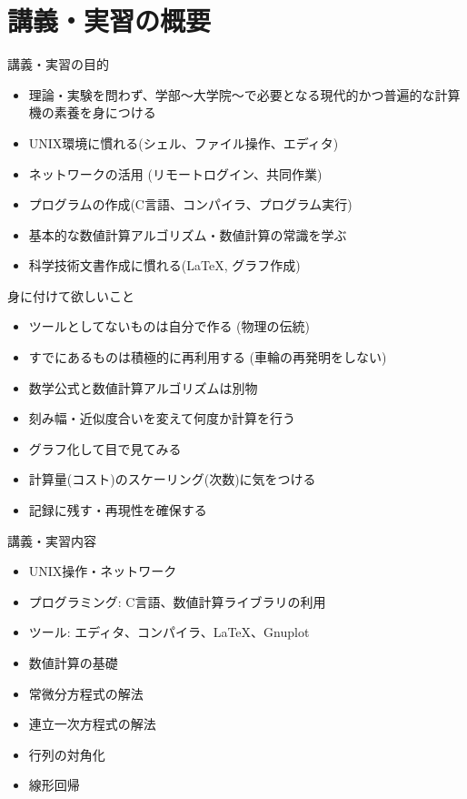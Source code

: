 \section{講義・実習の概要}

\begin{frame}[t]{講義・実習の目的}
  \begin{itemize}
  \item 理論・実験を問わず、学部〜大学院〜で必要となる現代的かつ普遍的な計算機の素養を身につける
  \item UNIX環境に慣れる(シェル、ファイル操作、エディタ)
  \item ネットワークの活用 (リモートログイン、共同作業)
  \item プログラムの作成(C言語、コンパイラ、プログラム実行)
  \item 基本的な数値計算アルゴリズム・数値計算の常識を学ぶ
  \item 科学技術文書作成に慣れる(\LaTeX, グラフ作成)
  \end{itemize}
\end{frame}

\begin{frame}[t]{身に付けて欲しいこと}
  \begin{itemize}
  \item ツールとしてないものは自分で作る (物理の伝統)
  \item すでにあるものは積極的に再利用する (車輪の再発明をしない)
  \item 数学公式と数値計算アルゴリズムは別物
  \item 刻み幅・近似度合いを変えて何度か計算を行う
  \item グラフ化して目で見てみる
  \item 計算量(コスト)のスケーリング(次数)に気をつける
  \item 記録に残す・再現性を確保する
  \end{itemize}
\end{frame}

\begin{frame}[t]{講義・実習内容}
  \begin{itemize}
  \item UNIX操作・ネットワーク
  \item プログラミング: C言語、数値計算ライブラリの利用
  \item ツール: エディタ、コンパイラ、\LaTeX、Gnuplot
  \item 数値計算の基礎
  \item 常微分方程式の解法
  \item 連立一次方程式の解法
  \item 行列の対角化
  \item 線形回帰
  \end{itemize}
\end{frame}

